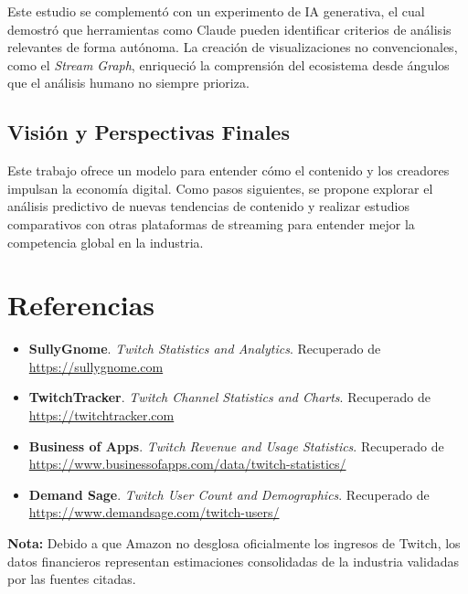 \documentclass[12pt,a4paper]{article}
\begin{document}
Este estudio se complementó con un experimento de IA generativa, el cual demostró que herramientas como Claude pueden identificar criterios de análisis relevantes de forma autónoma. La creación de visualizaciones no convencionales, como el \textit{Stream Graph}, enriqueció la comprensión del ecosistema desde ángulos que el análisis humano no siempre prioriza.

\subsection{Visión y Perspectivas Finales}

Este trabajo ofrece un modelo para entender cómo el contenido y los creadores impulsan la economía digital. Como pasos siguientes, se propone explorar el análisis predictivo de nuevas tendencias de contenido y realizar estudios comparativos con otras plataformas de streaming para entender mejor la competencia global en la industria.

\newpage

\section*{Referencias} 

\begin{itemize}
    \item \textbf{SullyGnome}. \textit{Twitch Statistics and Analytics}. Recuperado de \url{https://sullygnome.com}\\
    \item \textbf{TwitchTracker}. \textit{Twitch Channel Statistics and Charts}. Recuperado de \url{https://twitchtracker.com}\\
    \item \textbf{Business of Apps}. \textit{Twitch Revenue and Usage Statistics}. Recuperado de \url{https://www.businessofapps.com/data/twitch-statistics/}\\
    \item \textbf{Demand Sage}. \textit{Twitch User Count and Demographics}. Recuperado de \url{https://www.demandsage.com/twitch-users/}
\end{itemize}

\vspace{0.5cm}
\small \textbf{Nota:} Debido a que Amazon no desglosa oficialmente los ingresos de Twitch, los datos financieros representan estimaciones consolidadas de la industria validadas por las fuentes citadas.
\end{document}

